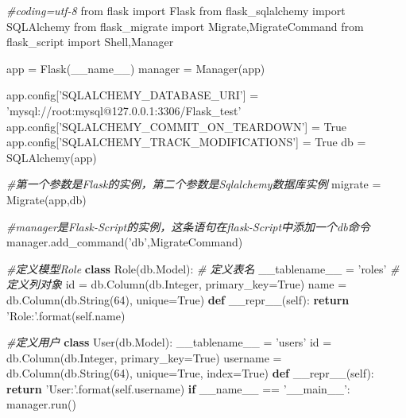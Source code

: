 \documentclass[11pt]{article}
\newenvironment{Shaded}{}{}
\newcommand{\KeywordTok}[1]{\textcolor[rgb]{0.00,0.44,0.13}{\textbf{{#1}}}}
\newcommand{\DecValTok}[1]{\textcolor[rgb]{0.25,0.63,0.44}{{#1}}}
\newcommand{\StringTok}[1]{\textcolor[rgb]{0.25,0.44,0.63}{{#1}}}
\newcommand{\CommentTok}[1]{\textcolor[rgb]{0.38,0.63,0.69}{\textit{{#1}}}}
\newcommand{\FunctionTok}[1]{\textcolor[rgb]{0.02,0.16,0.49}{{#1}}}
\newcommand{\NormalTok}[1]{{#1}}
\newcommand{\ImportTok}[1]{{#1}}
\newcommand{\VariableTok}[1]{\textcolor[rgb]{0.10,0.09,0.49}{{#1}}}
\newcommand{\ControlFlowTok}[1]{\textcolor[rgb]{0.00,0.44,0.13}{\textbf{{#1}}}}
\newcommand{\OperatorTok}[1]{\textcolor[rgb]{0.40,0.40,0.40}{{#1}}}
\newcommand{\BuiltInTok}[1]{{#1}}
\begin{document}
\begin{Shaded}
\begin{Highlighting}[]
\CommentTok{#coding=utf-8}
\ImportTok{from}\NormalTok{ flask }\ImportTok{import}\NormalTok{ Flask}
\ImportTok{from}\NormalTok{ flask_sqlalchemy }\ImportTok{import}\NormalTok{ SQLAlchemy}
\ImportTok{from}\NormalTok{ flask_migrate }\ImportTok{import}\NormalTok{ Migrate,MigrateCommand}
\ImportTok{from}\NormalTok{ flask_script }\ImportTok{import}\NormalTok{ Shell,Manager}

\NormalTok{app }\OperatorTok{=}\NormalTok{ Flask(}\VariableTok{__name__}\NormalTok{)}
\NormalTok{manager }\OperatorTok{=}\NormalTok{ Manager(app)}

\NormalTok{app.config[}\StringTok{'SQLALCHEMY_DATABASE_URI'}\NormalTok{] }\OperatorTok{=} \StringTok{'mysql://root:mysql@127.0.0.1:3306/Flask_test'}
\NormalTok{app.config[}\StringTok{'SQLALCHEMY_COMMIT_ON_TEARDOWN'}\NormalTok{] }\OperatorTok{=} \VariableTok{True}
\NormalTok{app.config[}\StringTok{'SQLALCHEMY_TRACK_MODIFICATIONS'}\NormalTok{] }\OperatorTok{=} \VariableTok{True}
\NormalTok{db }\OperatorTok{=}\NormalTok{ SQLAlchemy(app)}

\CommentTok{#第一个参数是Flask的实例，第二个参数是Sqlalchemy数据库实例}
\NormalTok{migrate }\OperatorTok{=}\NormalTok{ Migrate(app,db) }

\CommentTok{#manager是Flask-Script的实例，这条语句在flask-Script中添加一个db命令}
\NormalTok{manager.add_command(}\StringTok{'db'}\NormalTok{,MigrateCommand)}

\CommentTok{#定义模型Role}
\KeywordTok{class}\NormalTok{ Role(db.Model):}
    \CommentTok{# 定义表名}
\NormalTok{    __tablename__ }\OperatorTok{=} \StringTok{'roles'}
    \CommentTok{# 定义列对象}
    \BuiltInTok{id} \OperatorTok{=}\NormalTok{ db.Column(db.Integer, primary_key}\OperatorTok{=}\VariableTok{True}\NormalTok{)}
\NormalTok{    name }\OperatorTok{=}\NormalTok{ db.Column(db.String(}\DecValTok{64}\NormalTok{), unique}\OperatorTok{=}\VariableTok{True}\NormalTok{)}
    \KeywordTok{def} \FunctionTok{__repr__}\NormalTok{(}\VariableTok{self}\NormalTok{):}
        \ControlFlowTok{return} \StringTok{'Role:'}\NormalTok{.}\BuiltInTok{format}\NormalTok{(}\VariableTok{self}\NormalTok{.name)}

\CommentTok{#定义用户}
\KeywordTok{class}\NormalTok{ User(db.Model):}
\NormalTok{    __tablename__ }\OperatorTok{=} \StringTok{'users'}
    \BuiltInTok{id} \OperatorTok{=}\NormalTok{ db.Column(db.Integer, primary_key}\OperatorTok{=}\VariableTok{True}\NormalTok{)}
\NormalTok{    username }\OperatorTok{=}\NormalTok{ db.Column(db.String(}\DecValTok{64}\NormalTok{), unique}\OperatorTok{=}\VariableTok{True}\NormalTok{, index}\OperatorTok{=}\VariableTok{True}\NormalTok{)}
    \KeywordTok{def} \FunctionTok{__repr__}\NormalTok{(}\VariableTok{self}\NormalTok{):}
        \ControlFlowTok{return} \StringTok{'User:'}\NormalTok{.}\BuiltInTok{format}\NormalTok{(}\VariableTok{self}\NormalTok{.username)}
\ControlFlowTok{if} \VariableTok{__name__} \OperatorTok{==} \StringTok{'__main__'}\NormalTok{:}
\NormalTok{    manager.run()}
\end{Highlighting}
\end{Shaded}
\end{document}
